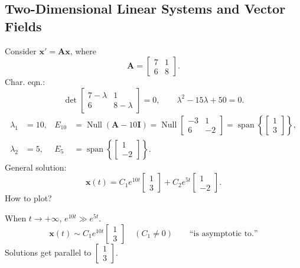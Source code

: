 \subsection{Two-Dimensional Linear Systems and Vector Fields}

\begin{example}
  Consider $\mathbf{x}'=\mathbf{A}\mathbf{x}$, where
  \[
    \mathbf{A}=
    \begin{bmatrix}
      7 & 1 \\6&8
    \end{bmatrix}
    .
  \]
  Char. eqn.:
  \[
    \det
    \begin{bmatrix}
      7-\lambda & 1 \\6&8-\lambda
    \end{bmatrix}
    =0,
    \qquad \lambda^2-15\lambda+50=0.
  \]
  \begin{align*}
    \lambda_1 & =10, & E_{10} & =\operatorname{Null}(\mathbf{A}-10\mathbf{I})
    =\operatorname{Null}
    \begin{bmatrix}
      -3 & 1 \\6&-2
    \end{bmatrix}
    =\operatorname{span}\left\{
    \begin{bmatrix}
      1 \\3
    \end{bmatrix}
    \right\},                                                                 \\
    \lambda_2 & =5,  & E_5    & =\operatorname{span}\left\{
    \begin{bmatrix}
      1 \\-2
    \end{bmatrix}
    \right\}.
  \end{align*}
  General solution:
  \[
    \mathbf{x}(t)=C_1e^{10t}
    \begin{bmatrix}
      1 \\3
    \end{bmatrix}
    +C_2e^{5t}
    \begin{bmatrix}
      1 \\-2
    \end{bmatrix}
    .
  \]
  How to plot?

  When $t\to+\infty$, $e^{10t}\gg e^{5t}$.
  \[
    \mathbf{x}(t)\sim C_1e^{10t}
    \begin{bmatrix}
      1 \\3
    \end{bmatrix}
    \quad(C_1\ne0)\qquad\text{``is asymptotic to.''}
  \]
  Solutions get parallel to $
    \begin{bmatrix}
      1 \\3
    \end{bmatrix}
  $.


\end{example}
